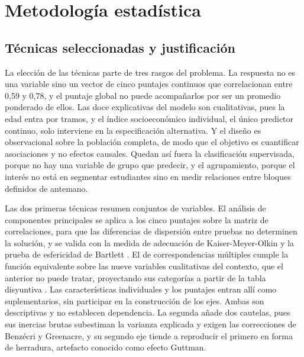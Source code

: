 \documentclass[12pt]{article}
\begin{document}
\vspace{0.1cm}

\section{Metodología estadística}
\label{sec:met-estadistica}

\subsection{Técnicas seleccionadas y justificación}

La elección de las técnicas parte de tres rasgos del problema. La respuesta no es una variable
sino un vector de cinco puntajes continuos que correlacionan entre 0,59 y 0,78, y el puntaje
global no puede acompañarlos por ser un promedio ponderado de ellos. Las doce explicativas del
modelo son cualitativas, pues la edad entra por tramos, y el índice socioeconómico individual, el
único predictor continuo, solo interviene en la especificación alternativa. Y el diseño es
observacional sobre la población completa, de modo que el objetivo es cuantificar
asociaciones y no efectos causales. Quedan así fuera la clasificación supervisada,
porque no hay una variable de grupo que predecir, y el agrupamiento, porque el interés no está en
segmentar estudiantes sino en medir relaciones entre bloques definidos de antemano.

Las dos primeras técnicas resumen conjuntos de variables. El análisis de componentes principales
se aplica a los cinco puntajes sobre la matriz de correlaciones, para que las diferencias de
dispersión entre pruebas no determinen la solución, y se valida con la medida de adecuación de
Kaiser-Meyer-Olkin y la prueba de esfericidad de Bartlett \parencite{johnson2007}. El de
correspondencias múltiples cumple la función equivalente sobre las nueve variables cualitativas
del contexto, que el anterior no puede tratar, proyectando sus categorías a partir de la tabla
disyuntiva \parencite{greenacre2017}. Las características individuales y los puntajes entran allí
como suplementarios, sin participar en la construcción de los ejes. Ambas son descriptivas y no
establecen dependencia. La segunda añade dos cautelas, pues sus inercias brutas subestiman la
varianza explicada y exigen las correcciones de Benzécri y Greenacre, y su segundo eje tiende a
reproducir el primero en forma de herradura, artefacto conocido como efecto Guttman.
\end{document}
